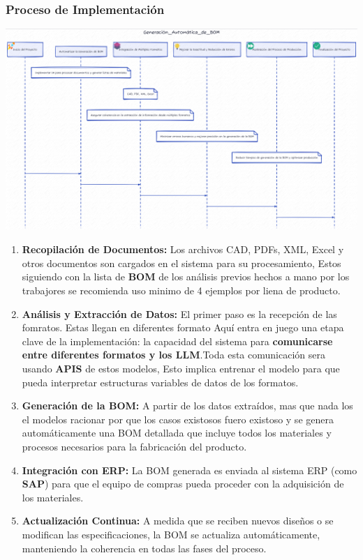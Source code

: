 \documentclass[
  10pt,
  letterpaper,
]{book}
\providecommand{\tightlist}{%
  \setlength{\itemsep}{0pt}\setlength{\parskip}{0pt}}\usepackage{longtable,booktabs,array}
\begin{document}
\subsubsection{Proceso de
Implementación}\label{proceso-de-implementaciuxf3n}

\includegraphics[width=1\textwidth,height=\textheight]{index_files/mediabag/diagram-6.pdf}

\begin{enumerate}
\def\labelenumi{\arabic{enumi}.}
\tightlist
\item
  \textbf{Recopilación de Documentos:} Los archivos CAD, PDFs, XML,
  Excel y otros documentos son cargados en el sistema para su
  procesamiento, Estos siguiendo con la lista de \textbf{BOM} de los
  análisis previos hechos a mano por los trabajores se recomienda uso
  minimo de 4 ejemplos por liena de producto.
\item
  \textbf{Análisis y Extracción de Datos:} El primer paso es la
  recepción de las fomratos. Estas llegan en diferentes formato Aquí
  entra en juego una etapa clave de la implementación: la capacidad del
  sistema para \textbf{comunicarse entre diferentes formatos y los
  LLM}.Toda esta comunicación sera usando \textbf{APIS} de estos
  modelos, Esto implica entrenar el modelo para que pueda interpretar
  estructuras variables de datos de los formatos.
\item
  \textbf{Generación de la BOM:} A partir de los datos extraídos, mas
  que nada los el modelos racionar por que los casos existosos fuero
  existoso y se genera automáticamente una BOM detallada que incluye
  todos los materiales y procesos necesarios para la fabricación del
  producto.
\item
  \textbf{Integración con ERP:} La BOM generada es enviada al sistema
  ERP (como \textbf{SAP}) para que el equipo de compras pueda proceder
  con la adquisición de los materiales.
\item
  \textbf{Actualización Continua:} A medida que se reciben nuevos
  diseños o se modifican las especificaciones, la BOM se actualiza
  automáticamente, manteniendo la coherencia en todas las fases del
  proceso.
\end{enumerate}
\end{document}

